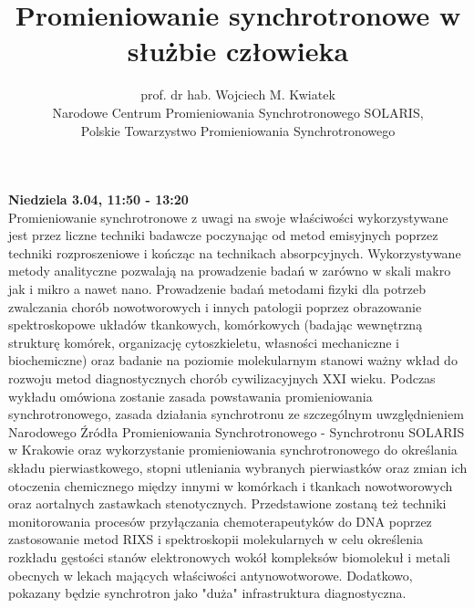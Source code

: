 \documentclass[12pt, a4paper]{article}
\begin{document}
\title{Promieniowanie synchrotronowe w służbie człowieka}
\author{prof. dr hab. Wojciech M. Kwiatek \\Narodowe Centrum Promieniowania Synchrotronowego SOLARIS, \\Polskie Towarzystwo Promieniowania Synchrotronowego}
\date {}
\maketitle
\thispagestyle{title}
\textbf{Niedziela 3.04, 11:50 - 13:20}
\\

Promieniowanie synchrotronowe z uwagi na swoje właściwości wykorzystywane jest przez liczne techniki badawcze poczynając od metod emisyjnych poprzez techniki rozproszeniowe i kończąc na technikach absorpcyjnych. Wykorzystywane metody analityczne pozwalają na prowadzenie badań w zarówno w skali makro jak i mikro a nawet nano. Prowadzenie badań metodami fizyki dla potrzeb zwalczania chorób nowotworowych i innych patologii poprzez obrazowanie spektroskopowe układów tkankowych, komórkowych (badając wewnętrzną strukturę komórek, organizację cytoszkieletu, własności mechaniczne i biochemiczne) oraz badanie na poziomie molekularnym stanowi ważny wkład do rozwoju metod diagnostycznych chorób cywilizacyjnych XXI wieku. Podczas wykładu omówiona zostanie zasada powstawania promieniowania synchrotronowego, zasada działania synchrotronu ze szczególnym uwzględnieniem Narodowego Źródła Promieniowania Synchrotronowego - Synchrotronu SOLARIS w Krakowie oraz wykorzystanie promieniowania synchrotronowego do określania składu pierwiastkowego, stopni utleniania wybranych pierwiastków oraz zmian ich otoczenia chemicznego między innymi w komórkach i tkankach nowotworowych oraz aortalnych zastawkach stenotycznych. Przedstawione zostaną też techniki monitorowania procesów przyłączania chemoterapeutyków do DNA poprzez zastosowanie metod RIXS i spektroskopii molekularnych w celu określenia rozkładu gęstości stanów elektronowych wokół kompleksów biomolekuł i metali obecnych w lekach mających właściwości antynowotworowe. Dodatkowo, pokazany będzie synchrotron jako "duża" infrastruktura diagnostyczna. 
\end{document}
